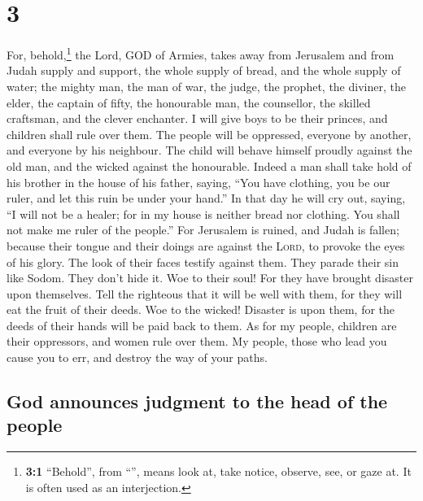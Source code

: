 \hypertarget{section-2}{%
\section{3}\label{section-2}}

 For, behold,\footnote{\textbf{3:1} ``Behold'', from
  ``'', means look at, take notice, observe, see, or gaze
  at. It is often used as an interjection.} the Lord, GOD of Armies,
takes away from Jerusalem and from Judah supply and support, the whole
supply of bread, and the whole supply of water;  the
mighty man, the man of war, the judge, the prophet, the diviner, the
elder,  the captain of fifty, the honourable man, the
counsellor, the skilled craftsman, and the clever enchanter.
 I will give boys to be their princes, and children shall
rule over them.  The people will be oppressed, everyone by
another, and everyone by his neighbour. The child will behave himself
proudly against the old man, and the wicked against the honourable.
 Indeed a man shall take hold of his brother in the house
of his father, saying, ``You have clothing, you be our ruler, and let
this ruin be under your hand.''  In that day he will cry
out, saying, ``I will not be a healer; for in my house is neither bread
nor clothing. You shall not make me ruler of the people.''
 For Jerusalem is ruined, and Judah is fallen; because
their tongue and their doings are against the \textsc{Lord}, to provoke
the eyes of his glory.  The look of their faces testify
against them. They parade their sin like Sodom. They don't hide it. Woe
to their soul! For they have brought disaster upon themselves.
 Tell the righteous that it will be well with them, for
they will eat the fruit of their deeds.  Woe to the
wicked! Disaster is upon them, for the deeds of their hands will be paid
back to them.  As for my people, children are their
oppressors, and women rule over them. My people, those who lead you
cause you to err, and destroy the way of your paths.

\hypertarget{god-announces-judgment-to-the-head-of-the-people}{%
\subsection{God announces judgment to the head of the
people}\label{god-announces-judgment-to-the-head-of-the-people}}

